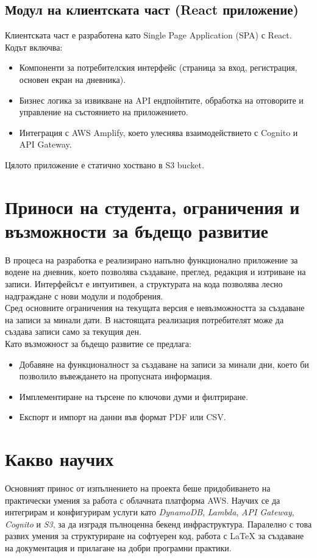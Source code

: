 \documentclass[12pt]{article}
\begin{document}
\subsection{Модул на клиентската част (React приложение)}
Клиентската част е разработена като Single Page Application (SPA) с React. Кодът включва:
\begin{itemize}
    \item Компоненти за потребителския интерфейс (страница за вход, регистрация, основен екран на дневника).
    \item Бизнес логика за извикване на API ендпойнтите, обработка на отговорите и управление на състоянието на приложението.
    \item Интеграция с AWS Amplify, което улеснява взаимодействието с Cognito и API Gateway.
\end{itemize}
Цялото приложение е статично хоствано в S3 bucket.

\medskip


\section{Приноси на студента, ограничения и възможности за бъдещо развитие}

В процеса на разработка е реализирано напълно функционално приложение за водене на дневник, което позволява създаване, преглед, редакция и изтриване на записи. Интерфейсът е интуитивен, а структурата на кода позволява лесно надграждане с нови модули и подобрения. \\

Сред основните ограничения на текущата версия е невъзможността за създаване на записи за минали дати. В настоящата реализация потребителят може да създава записи само за текущия ден. \\

Като възможност за бъдещо развитие се предлага:
\begin{itemize}
    \item Добавяне на функционалност за създаване на записи за минали дни, което би позволило въвеждането на пропусната информация.
    \item Имплементиране на търсене по ключови думи и филтриране.
    \item Експорт и импорт на данни във формат PDF или CSV.
\end{itemize}

\medskip


\section{Какво научих}
Основният принос от изпълнението на проекта беше придобиването на практически умения за работа с облачната платформа AWS.  
Научих се да интегрирам и конфигурирам услуги като \textit{DynamoDB}, \textit{Lambda}, \textit{API Gateway}, \textit{Cognito} и \textit{S3}, за да изградя пълноценна бекенд инфраструктура.  
Паралелно с това развих умения за структуриране на софтуерен код, работа с \LaTeX{} за създаване на документация и прилагане на добри програмни практики.
\end{document}
